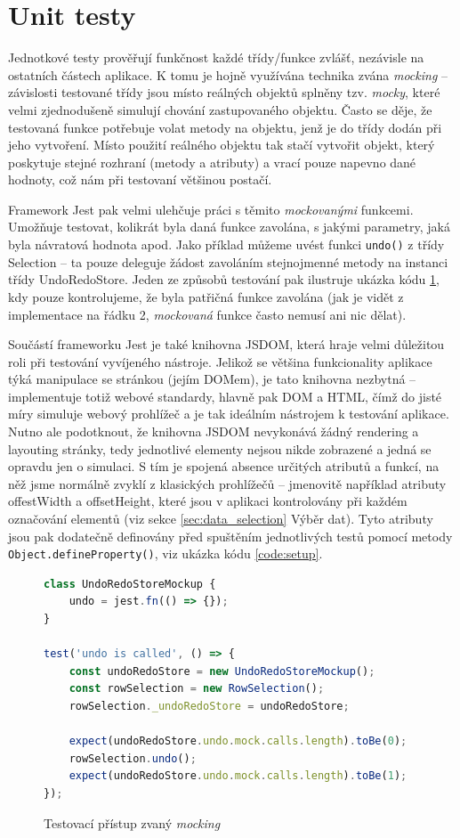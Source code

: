 \documentclass[thesis=B,czech]{FITthesis}[2012/06/26]
\begin{document}
\section{Unit testy}
Jednotkové testy prověřují funkčnost každé třídy/funkce zvlášť, nezávisle na ostatních částech aplikace. K tomu je hojně využívána technika zvána \emph{mocking} -- závislosti testované třídy jsou místo reálných objektů splněny tzv. \emph{mocky}, které velmi zjednodušeně simulují chování zastupovaného objektu. Často se děje, že testovaná funkce potřebuje volat metody na objektu, jenž je do třídy dodán při jeho vytvoření. Místo použití reálného objektu tak stačí vytvořit objekt, který poskytuje stejné rozhraní (metody a atributy) a vrací pouze napevno dané hodnoty, což nám při testovaní většinou postačí.

Framework Jest pak velmi ulehčuje práci s těmito \emph{mockovanými} funkcemi. Umožňuje testovat, kolikrát byla daná funkce zavolána, s jakými parametry, jaká byla návratová hodnota apod. Jako příklad můžeme uvést funkci \verb|undo()| z třídy Selection -- ta pouze deleguje žádost zavoláním stejnojmenné metody na instanci třídy UndoRedoStore. Jeden ze způsobů testování pak ilustruje ukázka kódu \ref{code:mocking}, kdy pouze kontrolujeme, že byla patřičná funkce zavolána (jak je vidět z implementace na řádku 2, \emph{mockovaná} funkce často nemusí ani nic dělat).

Součástí frameworku Jest je také knihovna JSDOM, která hraje velmi důležitou roli při testování vyvíjeného nástroje. Jelikož se většina funkcionality aplikace týká manipulace se stránkou (jejím DOMem), je tato knihovna nezbytná -- implementuje totiž webové standardy, hlavně pak DOM a HTML, čímž do jisté míry simuluje webový prohlížeč a je tak ideálním nástrojem k testování aplikace. Nutno ale podotknout, že knihovna JSDOM nevykonává žádný rendering a layouting stránky, tedy jednotlivé elementy nejsou nikde zobrazené a jedná se opravdu jen o simulaci. S tím je spojená absence určitých atributů a funkcí, na něž jsme normálně zvyklí z klasických prohlížečů -- jmenovitě například atributy \textsf{offestWidth} a \textsf{offsetHeight}, které jsou v aplikaci kontrolovány při každém označování elementů (viz sekce \ref{sec:data_selection} Výběr dat). Tyto atributy jsou pak dodatečně definovány před spuštěním jednotlivých testů pomocí metody \verb|Object.defineProperty()|, viz ukázka kódu \ref{code:setup}.

\begin{figure}
	\begin{lstlisting}[language=JavaScript]
class UndoRedoStoreMockup {
	undo = jest.fn(() => {});
}
	
test('undo is called', () => {
	const undoRedoStore = new UndoRedoStoreMockup();
	const rowSelection = new RowSelection();
	rowSelection._undoRedoStore = undoRedoStore;
	
	expect(undoRedoStore.undo.mock.calls.length).toBe(0);
	rowSelection.undo();
	expect(undoRedoStore.undo.mock.calls.length).toBe(1);
});
	\end{lstlisting}
	\caption{Testovací přístup zvaný \emph{mocking}}
	\label{code:mocking}
\end{figure}
\end{document}
